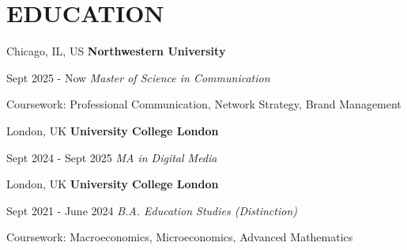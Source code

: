     \section{EDUCATION}
 
        \begin{twocolentry}{
            Chicago, IL, US
        }
            {\ResumeEntryTitleFont\textbf{Northwestern University}}
        \end{twocolentry}
        \begin{twocolentry}{
            Sept 2025 - Now
        }
            \textit{Master of Science in Communication}
        \end{twocolentry}
        \vspace{0.08 cm}
        \begin{onecolentry}
            \begin{highlights}
                \item Coursework: Professional Communication, Network Strategy, Brand Management
            \end{highlights}
        \end{onecolentry}

        \vspace{0.10 cm}
 
        \begin{twocolentry}{
            London, UK
        }
            {\ResumeEntryTitleFont\textbf{University College London}}
        \end{twocolentry}
        \begin{twocolentry}{
            Sept 2024 - Sept 2025
        }
            \textit{MA in Digital Media}
        \end{twocolentry}

        \vspace{0.10 cm}
 
        \begin{twocolentry}{
            London, UK
        }
            {\ResumeEntryTitleFont\textbf{University College London}}
        \end{twocolentry}
        \begin{twocolentry}{
            Sept 2021 - June 2024
        }
            \textit{B.A. Education Studies (Distinction)}
        \end{twocolentry}
        \vspace{0.08 cm}
        \begin{onecolentry}
            \begin{highlights}
                \item Coursework: Macroeconomics, Microeconomics, Advanced Mathematics
            \end{highlights}
        \end{onecolentry}

